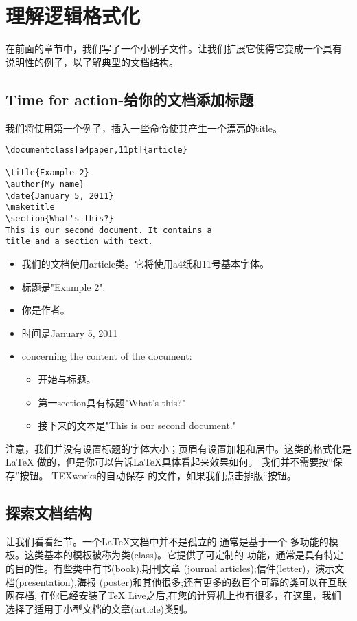 \section{理解逻辑格式化}
在前面的章节中，我们写了一个小例子文件。让我们扩展它使得它变成一个具有
说明性的例子，以了解典型的文档结构。
	\subsection{Time for action-给你的文档添加标题}
我们将使用第一个例子，插入一些命令使其产生一个漂亮的title。
\begin{lstlisting}[language={[LaTeX]TeX}]
\documentclass[a4paper,11pt]{article}

\title{Example 2}
\author{My name}
\date{January 5, 2011}
\maketitle
\section{What's this?}
This is our second document. It contains a
title and a section with text.

\end{lstlisting}
\begin{itemize}
	\item 我们的文档使用article类。它将使用a4纸和11号基本字体。
	\item 标题是"Example 2".
	\item 你是作者。
	\item 时间是January 5, 2011
	\item concerning the content of the document:
		\begin{itemize}
			\item 开始与标题。
			\item 第一section具有标题"What's this?"
			\item 接下来的文本是"This is our second document."
		\end{itemize}
\end{itemize}
注意，我们并没有设置标题的字体大小；页眉有设置加粗和居中。这类的格式化是LaTeX
做的，但是你可以告诉LaTeX具体看起来效果如何。
我们并不需要按“保存”按钮。 TEXworks的自动保存
的文件，如果我们点击排版“按钮。
	\subsection{探索文档结构}
让我们看看细节。一个LaTeX文档中并不是孤立的-通常是基于一个
多功能的模板。这类基本的模板被称为类(class)。它提供了可定制的
功能，通常是具有特定的目的性。有些类中有书(book),期刊文章
(journal articles);信件(letter)，演示文档(presentation),海报
(poster)和其他很多;还有更多的数百个可靠的类可以在互联网存档,
在你已经安装了TeX Live之后,在您的计算机上也有很多，在这里，我们
选择了适用于小型文档的文章(article)类别。

